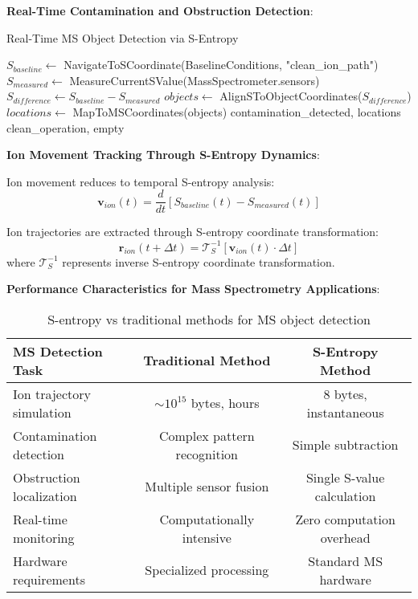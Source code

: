 \documentclass[11pt,a4paper]{article}
\theoremstyle{remark}
\begin{document}
\textbf{Real-Time Contamination and Obstruction Detection}:

\begin{algorithm}
\caption{Real-Time MS Object Detection via S-Entropy}
\begin{algorithmic}
    \State $S_{baseline} \gets$ NavigateToSCoordinate(BaselineConditions, "clean\_ion\_path")
    \State $S_{measured} \gets$ MeasureCurrentSValue(MassSpectrometer.sensors)
    \State $S_{difference} \gets S_{baseline} - S_{measured}$
        \State $objects \gets$ AlignSToObjectCoordinates($S_{difference}$)
        \State $locations \gets$ MapToMSCoordinates(objects)
        \State \Return contamination\_detected, locations
    \Else
        \State \Return clean\_operation, empty
    \EndIf
\EndProcedure
\end{algorithmic}
\end{algorithm}

\textbf{Ion Movement Tracking Through S-Entropy Dynamics}:

Ion movement reduces to temporal S-entropy analysis:
$$\mathbf{v}_{ion}(t) = \frac{d}{dt}[S_{baseline}(t) - S_{measured}(t)]$$

Ion trajectories are extracted through S-entropy coordinate transformation:
$$\mathbf{r}_{ion}(t + \Delta t) = \mathcal{T}_S^{-1}[\mathbf{v}_{ion}(t) \cdot \Delta t]$$
where $\mathcal{T}_S^{-1}$ represents inverse S-entropy coordinate transformation.

\textbf{Performance Characteristics for Mass Spectrometry Applications}:

\begin{table}[H]
\centering
\begin{tabular}{lcc}
\toprule
MS Detection Task & Traditional Method & S-Entropy Method \\
\midrule
Ion trajectory simulation & $\sim 10^{15}$ bytes, hours & 8 bytes, instantaneous \\
Contamination detection & Complex pattern recognition & Simple subtraction \\
Obstruction localization & Multiple sensor fusion & Single S-value calculation \\
Real-time monitoring & Computationally intensive & Zero computation overhead \\
Hardware requirements & Specialized processing & Standard MS hardware \\
\bottomrule
\end{tabular}
\caption{S-entropy vs traditional methods for MS object detection}
\end{table}
\end{document}
